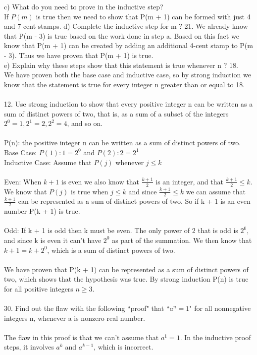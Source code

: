 \documentclass[11pt, oneside]{article}   	%
\begin{document}
c) What do you need to prove in the inductive step?\\
If $P(m)$ is true then we need to show that P(m + 1) can be formed with just 4 and 7 cent stamps. 
d) Complete the inductive step for m ? 21.
We already know that P(m - 3) is true based on the work done in step a. Based on this fact we know that P(m + 1) can be created by adding an additional 4-cent stamp to P(m - 3). Thus we have proven that P(m + 1) is true.  \\
e) Explain why these steps show that this statement is true whenever n ? 18.\\
We have proven both the base case and inductive case, so by strong induction we know that the statement is true for every integer n greater than or equal to 18. \\\\
12. Use strong induction to show that every positive integer n can be written as a sum of distinct powers of two, that is, as a sum of a subset of the integers $2^0 = 1,2^1 = 2,2^2 = 4$, and so on.\\\\
P(n): the positive integer n can be written as a sum of distinct powers of two. \\
Base Case: $P(1): 1 = 2^0$ and $P(2): 2 = 2^1$\\
Inductive Case: Assume that $P(j)$ whenever $j\leq k$\\\\
Even: When $ k+ 1$ is even we also know that $\frac{k + 1}{2}$ is an integer, and that $\frac{k + 1}{2}\leq k$.  We know that $P(j)$ is true when $j\leq k$ and since $\frac{k + 1}{2}\leq k$ we can assume that $\frac{k + 1}{2}$ can be represented as a sum of distinct powers of two. So if k + 1 is an even number P(k + 1) is true.\\\\
Odd: If k + 1 is odd then k must be even. The only power of 2 that is odd is $2^0$, and since k is even it can't have $2^0$ as part of the summation. We then know that $k + 1 = k + 2^0$, which is a sum of distinct powers of two. \\\\
We have proven that P(k + 1) can be represented as a sum of distinct powers of two, which shows that the hypothesis was true. By strong induction P(n) is true for all positive integers $n\geq 3$. \\\\
30. Find out the flaw with the following ``proof" that ``$a^n = 1$" for all nonnegative integers n, whenever a is nonzero real number.\\\\
The flaw in this proof is that we can't assume that $a^1 = 1$. In the inductive proof steps, it involves $a^k$ and $a^{k - 1}$, which is incorrect. 
\end{document}
